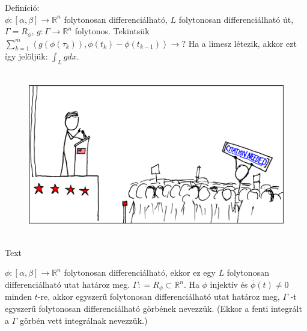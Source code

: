 \documentclass[12pt,a4paper]{scrartcl}
\newenvironment{definicio}{}{}
\newenvironment{ajanlofig}{\begin{figure}\begin{center}}{
\end{center}\end{figure}}
\begin{document}
\begin{definicio}

Definíció:\\
\(\left. \phi:\left\lbrack {\alpha,\beta} \right\rbrack\rightarrow{\mathbb{R}}^{n} \right.\)
folytonosan differenciálható, \(L\) folytonosan differenciálható út,
\(\Gamma = R_{\phi}\),
\(\left. g:\Gamma\rightarrow{\mathbb{R}}^{n} \right.\) folytonos.
Tekintsük
\(\left. {\sum\limits_{k = 1}^{m}\left\langle {g\left( {\phi\left( \tau_{k} \right)} \right),\phi\left( t_{k} \right) - \phi\left( t_{k - 1} \right)} \right\rangle}\rightarrow? \right.\)
Ha a limesz létezik, akkor ezt így jelöljük: \(\int_{L}{gdx}\).

\end{definicio}

\begin{ajanlo}

\begin{ajanlofig}

\href{https://xkcd.com}{\includegraphics[width=5.20833in,height=2.82292in]{wikipedian_protester.png}}

\end{ajanlofig}

Text

\end{ajanlo}

\(\left. \phi:\left\lbrack {\alpha,\beta} \right\rbrack\rightarrow{\mathbb{R}}^{n} \right.\)
folytonosan differenciálható, ekkor ez egy \(L\) folytonosan
differenciálható utat határoz meg.
\(\Gamma: = R_{\phi} \subset {\mathbb{R}}^{n}\). Ha \(\phi\) injektív és
\(\overset{.}{\phi}\left( t \right) \neq 0\) minden \(t\)-re, akkor
egyszerű folytonosan differenciálható utat határoz meg, \(\Gamma\) -t
egyszerű folytonosan differenciálható görbének nevezzük. (Ekkor a fenti
integrált a \(\Gamma\) görbén vett integrálnak nevezzük.)
\end{document}
